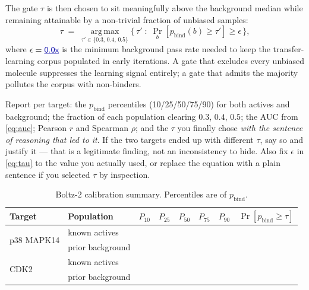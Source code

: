 \documentclass[11pt]{article}
\newcommand{\FILL}[1]{\textcolor{blue!65!black}{\underline{\textsf{#1}}}}
\newcommand{\pbind}{p_{\mathrm{bind}}}          %
\begin{document}
The gate $\tau$ is then chosen to sit meaningfully above the background median
while remaining attainable by a non-trivial fraction of unbiased samples:
\begin{equation}
  \tau \;=\;
  \operatorname*{arg\,max}_{\tau' \in \{0.3,\,0.4,\,0.5\}}
  \Big\{\,\tau' \;:\;
    \Pr_{b}\!\left[\pbind(b) \ge \tau'\right] \ge \epsilon
  \,\Big\},
  \label{eq:tau}
\end{equation}
where $\epsilon = \FILL{0.0x}$ is the minimum background pass rate needed to
keep the transfer-learning corpus populated in early iterations. A gate that
excludes every unbiased molecule suppresses the learning signal entirely; a
gate that admits the majority pollutes the corpus with non-binders.

\begin{yourturn}
Report per target: the $\pbind$ percentiles (10/25/50/75/90) for both actives
and background; the fraction of each population clearing $0.3$, $0.4$, $0.5$;
the AUC from \cref{eq:auc}; Pearson $r$ and Spearman $\rho$; and the $\tau$ you
finally chose \emph{with the sentence of reasoning that led to it}. If the two
targets ended up with different $\tau$, say so and justify it --- that is a
legitimate finding, not an inconsistency to hide. Also fix $\epsilon$ in
\cref{eq:tau} to the value you actually used, or replace the equation with a
plain sentence if you selected $\tau$ by inspection.
\end{yourturn}

\begin{table}[h]
\centering
\caption{Boltz-2 calibration summary. Percentiles are of $\pbind$.}
\label{tab:calibration}
\small
\begin{tabular}{llcccccc}
\toprule
Target & Population & $P_{10}$ & $P_{25}$ & $P_{50}$ & $P_{75}$ & $P_{90}$ & $\Pr[\pbind \ge \tau]$ \\
\midrule
\multirow{2}{*}{p38 MAPK14}
  & known actives & \FILL{} & \FILL{} & \FILL{} & \FILL{} & \FILL{} & \FILL{} \\
  & prior background & \FILL{} & \FILL{} & \FILL{} & \FILL{} & \FILL{} & \FILL{} \\
\midrule
\multirow{2}{*}{CDK2}
  & known actives & \FILL{} & \FILL{} & \FILL{} & \FILL{} & \FILL{} & \FILL{} \\
  & prior background & \FILL{} & \FILL{} & \FILL{} & \FILL{} & \FILL{} & \FILL{} \\
\bottomrule
\end{tabular}
\end{table}
\end{document}
